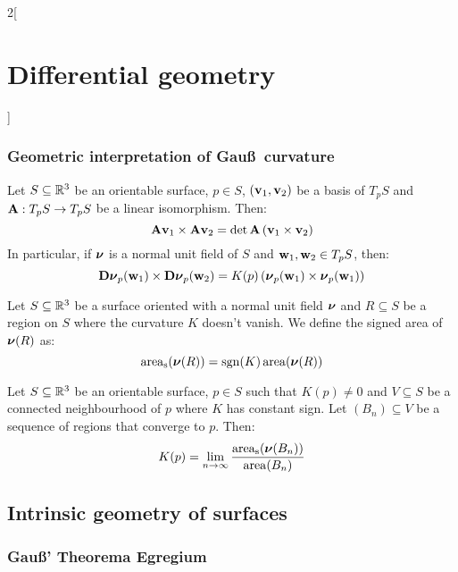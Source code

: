 \documentclass[../../../main.tex]{subfiles}
\begin{document}
\begin{multicols}{2}[\section{Differential geometry}]
  \subsubsection{Geometric interpretation of Gau\ss\ curvature}
  \begin{lemma}
    Let $S\subseteq\mathbb{R}^3$ be an orientable surface, $p\in S$, $(\boldsymbol{\mathrm{v}}_1,\boldsymbol{\mathrm{v}}_2)$ be a basis of $T_pS$ and $\boldsymbol{\mathrm{A}}:T_pS\rightarrow T_pS$ be a linear isomorphism. Then: $$\boldsymbol{\mathrm{A}}\boldsymbol{\mathrm{v}}_1\times\boldsymbol{\mathrm{A}}\boldsymbol{\mathrm{v}}_2=\det\boldsymbol{\mathrm{A}}\left(\boldsymbol{\mathrm{v}}_1\times\boldsymbol{\mathrm{v}}_2\right)$$
    In particular, if $\boldsymbol{\mathrm{\nu}}$ is a normal unit field of $S$ and $\boldsymbol{\mathrm{w}}_1,\boldsymbol{\mathrm{w}}_2\in T_pS$, then: $$\boldsymbol{\mathrm{D}}\boldsymbol{\mathrm{\nu}}_p(\boldsymbol{\mathrm{w}}_1)\times\boldsymbol{\mathrm{D}}\boldsymbol{\mathrm{\nu}}_p(\boldsymbol{\mathrm{w}}_2)=K(p)\left(\boldsymbol{\mathrm{\nu}}_p(\boldsymbol{\mathrm{w}}_1)\times\boldsymbol{\mathrm{\nu}}_p(\boldsymbol{\mathrm{w}}_1)\right)$$
  \end{lemma}
  \begin{definition}
    Let $S\subseteq\mathbb{R}^3$ be a surface oriented with a normal unit field $\boldsymbol{\mathrm{\nu}}$ and $R\subseteq S$ be a region on $S$ where the curvature $K$ doesn't vanish. We define the signed area of $\boldsymbol{\mathrm{\nu}}(R)$ as: $$\operatorname{area}_\text{s}(\boldsymbol{\mathrm{\nu}}(R))=\operatorname{sgn}(K)\operatorname{area}(\boldsymbol{\mathrm{\nu}}(R))$$
  \end{definition}
  \begin{proposition}
    Let $S\subseteq\mathbb{R}^3$ be an orientable surface, $p\in S$ such that $K(p)\ne 0$ and $V\subseteq S$ be a connected neighbourhood of $p$ where $K$ has constant sign. Let $(B_n)\subseteq V$ be a sequence of regions that converge to $p$. Then: $$K(p)=\lim_{n\to\infty}\frac{\operatorname{area}_\text{s}(\boldsymbol{\mathrm{\nu}}(B_n))}{\operatorname{area}(B_n)}$$
  \end{proposition}
  \subsection{Intrinsic geometry of surfaces}
  \subsubsection{Gau\ss' Theorema Egregium}
\end{multicols}
\end{document}
